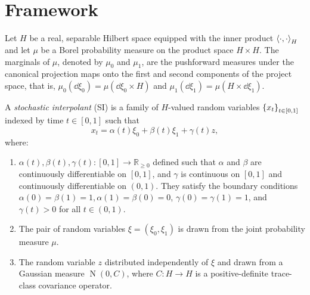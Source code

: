 
\section{Framework}


Let \(H\) be a real, separable Hilbert space equipped with the inner product \(\ev{\cdot, \cdot}_{H}\) and let \(\mu\) be a Borel probability measure on the product space \(H \times H\). The marginals of \(\mu\), denoted by \(\mu_{0}\) and \(\mu_{1}\), are the pushforward measures under the canonical projection maps onto the first and second components of the project space, that is, \(\mu_{0}(\dd{\xi_{0}}) = \mu(\dd{\xi_{0}}\times H)\) and \(\mu_{1}(\dd{\xi_{1}}) = \mu(H \times \dd{\xi_{1}})\).


\begin{definitionbox}
  \begin{definition}\label{dfn:stochint}
    A \textit{stochastic interpolant} (SI) is a family of \(H\)-valued random variables \(\qty{x_{t}}_{t \in [0, 1]}\) indexed by time \(t \in [0, 1]\) such that
    \[
      x_{t} = \alpha(t) \xi_{0} + \beta(t) \xi_{1} + \gamma(t)z,
    \]
    where:
    \begin{enumerate}
      \item \(\alpha(t), \beta(t), \gamma(t) : [0, 1] \to \mathbb{R}_{\geq 0}\) defined such that \(\alpha\) and \(\beta\) are continuously differentiable on \([0, 1]\), and \(\gamma\)  is continuous on \([0, 1]\) and continuously differentiable on \((0, 1)\). They satisfy the boundary conditions \(\alpha(0) = \beta(1) = 1, \alpha(1) = \beta(0) = 0\), \(\gamma(0) = \gamma(1) = 1\), and \(\gamma(t) > 0\) for all \(t \in (0, 1)\).
      \item The pair of random variables \(\xi = (\xi_0, \xi_1)\) is drawn from the joint probability measure \(\mu\).
      \item The random variable \(z\) distributed independently of \(\xi\) and drawn from a Gaussian measure \(\operatorname{N}(0, C)\), where \(C : H\to H\) is a positive-definite trace-class covariance operator.
    \end{enumerate}
  \end{definition}
\end{definitionbox}

